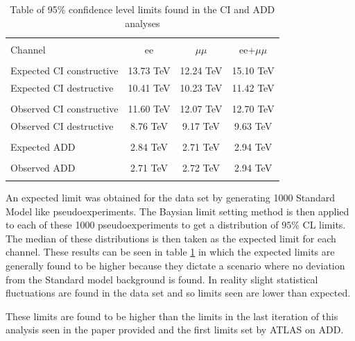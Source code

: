 \begin{table}[h!]
\centering %
\begin{tabular}{l ccc} %
\hline\hline \\[-2ex] %
Channel & ee & $\mu\mu$ & ee+$\mu\mu$\\  [0.2ex]
\hline  \\[-2ex] %
Expected CI constructive & 13.73 TeV & 12.24 TeV & 15.10 TeV\\ 
Expected CI destructive & 10.41 TeV & 10.23 TeV & 11.42 TeV \\ 
\hline  \\[-2ex] %
Observed CI constructive & 11.60 TeV & 12.07 TeV & 12.70 TeV \\ 
Observed CI destructive & 8.76 TeV & 9.17 TeV & 9.63 TeV \\ 
\hline\hline  \\[-2ex] %
Expected ADD & 2.84 TeV & 2.71 TeV & 2.94 TeV \\ 
\hline  \\[-2ex] %
Observed ADD & 2.71 TeV & 2.72 TeV & 2.94 TeV \\ 
\hline\hline  \\ %
\end{tabular}
\caption{Table of 95\% confidence level limits found in the CI and ADD analyses} %
\label{tab:CILimits}
\end{table}

An expected limit was obtained for the data set by generating 1000 Standard Model like pseudoexperiments. The Baysian limit setting method is then applied to each of these 1000 pseudoexperiments to get a distribution of $95\%$ CL limits. The median of these distributions is then taken as the expected limit for each channel. These results can be seen in table \ref{tab:CILimits} in which the expected limits are generally found to be higher because they dictate a scenario where no deviation from the Standard model background is found. In reality slight statistical fluctuations are found in the data set and so limits seen are lower than expected. 

These limits are found to be higher than the limits in the last iteration of this analysis seen in the paper provided and the first limits set by ATLAS on ADD.



